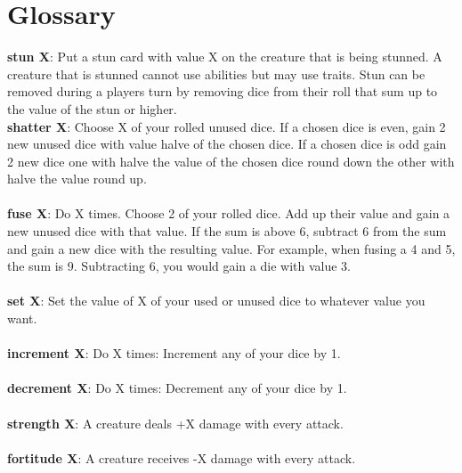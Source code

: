 \documentclass[a4paper,12pt]{article}
\begin{document}
\section{Glossary}
\textbf{stun X}: Put a stun card with value X on the creature that is being stunned.
A creature that is stunned cannot use abilities but may use traits.
Stun can be removed during a players turn by removing dice from their roll that sum up to the value of the stun or higher. 
\\

\textbf{shatter X}: Choose X of your rolled unused dice. If a chosen dice is even, gain 2 new unused dice with value halve of the chosen dice. 
If a chosen dice is odd gain 2 new dice one with halve the value of the chosen dice round down the other with halve the value round up.
\\
\\
\textbf{fuse X}: Do X times. Choose 2 of your rolled dice. Add up their value and gain a new unused dice with that value. If the sum is above 6, subtract 6 from the sum and gain a new dice with the resulting value. For example, when fusing a 4 and 5, the sum is 9. Subtracting 6, you would gain a die with value 3.
\\
\\
\textbf{set X}:
Set the value of X of your used or unused dice to whatever value you want.
\\
\\
\textbf{increment X}:
Do X times: Increment any of your dice by 1.
\\
\\
\textbf{decrement X}:
Do X times: Decrement any of your dice by 1.
\\
\\
\textbf{strength X}:
A creature deals +X damage with every attack.
\\
\\
\textbf{fortitude X}:
A creature receives -X damage with every attack.
\end{document}
